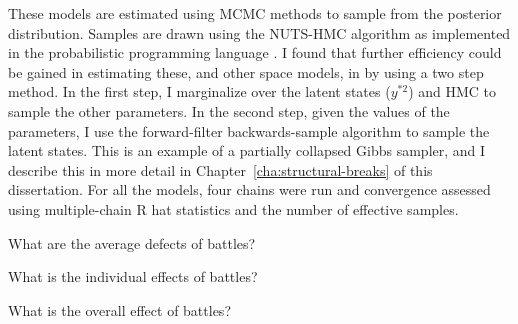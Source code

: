 These models are estimated using MCMC methods to sample from the posterior distribution.
Samples are drawn using the NUTS-HMC algorithm as implemented in the probabilistic programming language \Stan{} \parencites{Stan2015a}.
I found that further efficiency could be gained in estimating these, and other space models, in \Stan{} by using a two step method.
In the first step, I marginalize over the latent states ($y^{*2}$) and HMC to sample the other parameters.
In the second step, given the values of the parameters, I use the forward-filter backwards-sample algorithm to sample the latent states.
This is an example of a partially collapsed Gibbs sampler, and I describe this in more detail in Chapter~\ref{cha:structural-breaks} of this dissertation.
For all the models, four chains were run and convergence assessed using multiple-chain R hat statistics and the number of effective samples.


What are the average defects of battles?

What is the individual effects of battles?

What is the overall effect of battles?


